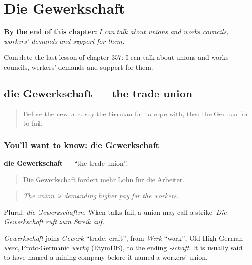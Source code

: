 
\chapter{Die Gewerkschaft}
\label{ch:ge-die-gewerkschaft}

\begin{chapteropening}
\textbf{By the end of this chapter:} \emph{I can talk about unions and works councils, workers' demands and support for them.}

Complete the last lesson of chapter 357: I can talk about unions and works councils, workers' demands and support for them.
\end{chapteropening}

\section[die Gewerkschaft]{die Gewerkschaft — the trade union}

\label{lesson:GE-C357-gewerkschaft}



\begin{quote}
Before the new one: say the German for to cope with, then the German for to fail.
\end{quote}

\subsection*{You'll want to know: die Gewerkschaft}
\textbf{die Gewerkschaft} — \textquotedblleft{}the trade union\textquotedblright{}.

\begin{quote}
Die Gewerkschaft fordert mehr Lohn für die Arbeiter.
\end{quote}

\begin{quote}
\emph{The union is demanding higher pay for the workers.}
\end{quote}

Plural: \emph{die Gewerkschaften}. When talks fail, a union may call a strike: \emph{Die Gewerkschaft ruft zum Streik auf.}

\begin{cousinweb}
\emph{Gewerkschaft} joins \emph{Gewerk} \textquotedblleft{}trade, craft\textquotedblright{}, from \emph{Werk} \textquotedblleft{}work\textquotedblright{}, Old High German \emph{werc}, Proto-Germanic \emph{werką} (EtymDB), to the ending \emph{-schaft}. It is usually said to have named a mining company before it named a workers' union.
\end{cousinweb}

